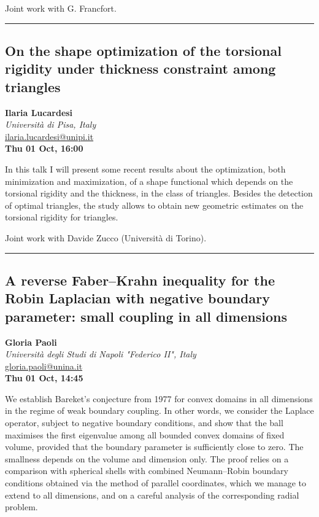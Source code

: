 \documentclass[a4paper,11pt]{article}
\begin{document}
\smallskip
Joint work with G. Francfort.

\newpage

\noindent\rule{\textwidth}{0.4pt}

\begin{center}
\subsection*{On the shape optimization of the torsional rigidity under thickness constraint among triangles}

\textbf{Ilaria Lucardesi} \\
\textit{Università di Pisa, Italy} \\
\url{ilaria.lucardesi@unipi.it} \\
\textbf{Thu 01 Oct, 16:00}
\
\end{center}
\medskip
In this talk I will present some recent results about the optimization, both minimization and maximization, of a shape functional which depends on the torsional rigidity and the thickness, in the class of triangles. Besides the detection of optimal triangles, the study allows to obtain new geometric estimates on the torsional rigidity for triangles.

\smallskip
Joint work with Davide Zucco (Università di Torino).

\newpage

\noindent\rule{\textwidth}{0.4pt}

\begin{center}
\subsection*{A reverse Faber–Krahn inequality for the Robin Laplacian with negative boundary parameter: small coupling in all dimensions}

\textbf{Gloria Paoli} \\
\textit{Università degli Studi di Napoli "Federico II", Italy} \\
\url{gloria.paoli@unina.it} \\
\textbf{Thu 01 Oct, 14:45}
\
\end{center}
\medskip
We establish Bareket’s conjecture from 1977 for convex domains in all dimensions in the regime of weak boundary coupling. In other words, we consider the Laplace operator, subject to negative boundary conditions, and show that the ball maximises the first eigenvalue among all bounded convex domains of fixed volume, provided that the boundary parameter is sufficiently close to zero. The smallness depends on the volume and dimension only. The proof relies on a comparison with spherical shells with combined Neumann–Robin boundary conditions obtained via the method of parallel coordinates, which we manage to extend to all dimensions, and on a careful analysis of the corresponding radial problem.
\end{document}
